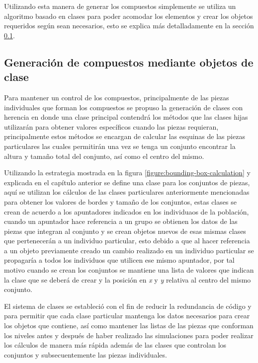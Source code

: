 Utilizando esta manera de generar los compuestos simplemente se utiliza un
algoritmo basado en clases para poder acomodar los elementos y crear los objetos
requeridos según sean necesarios, esto se explica más detalladamente en la
sección \ref{subsection:classorientedidea}.

\subsection{Generación de compuestos mediante objetos de clase}
\label{subsection:classorientedidea}

Para mantener un control de los compuestos, principalmente de las piezas
individuales que forman los compuestos se propuso la generación de clases con
herencia en donde una clase principal contendrá los métodos que las clases hijas
utilizarán para obtener valores específicos cuando las piezas requieran,
principalmente estos métodos se encargan de calcular las esquinas de las piezas
particulares las cuales permitirán una vez se tenga un conjunto encontrar la
altura y tamaño total del conjunto, así como el centro del mismo.

Utilizando la estrategia mostrada en la figura
\ref{figure:bounding-box-calculation} y explicada en el capítulo anterior se
define una clase para los conjuntos de piezas, aquí se utilizan los cálculos de
las clases particulares anteriormente mencionadas para obtener los valores de
bordes y tamaño de los conjuntos, estas clases se crean de acuerdo a los
apuntadores indicados en los individuaos de la población, cuando un apuntador
hace referencia a un grupo se obtienen los datos de las piezas que integran al
conjunto y se crean objetos nuevos de esas mismas clases que pertenecerán a un
individuo particular, esto debido a que al hacer referencia a un objeto
previamente creado un cambio realizado en un individuo particular se propagaría
a todos los individuos que utilicen ese mismo apuntador, por tal motivo cuando
se crean los conjuntos se mantiene una lista de valores que indican la clase que
se deberá de crear y la posición en \textit{x} y \textit{y} relativa al centro
del mismo conjunto.

El sistema de clases se estableció con el fin de reducir la redundancia de
código y para permitir que cada clase particular mantenga los datos necesarios
para crear los objetos que contiene, así como mantener las listas de las piezas
que conforman los niveles antes y después de haber realizado las simulaciones
para poder realizar los cálculos de manera más rápida además de las clases que
controlan los conjuntos y subsecuentemente las piezas individuales. 

